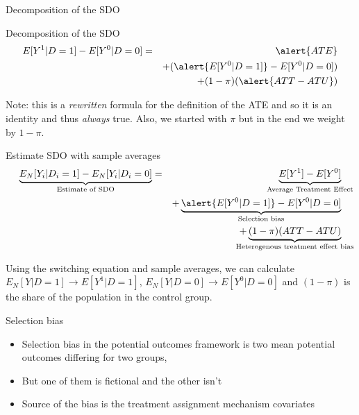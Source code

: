 \documentclass{beamer}
\begin{document}
\begin{frame}{Decomposition of the SDO}

  \begin{block}{Decomposition of the SDO}
    \begin{eqnarray*}
      E[Y^1 | D=1] - E[Y^0 | D=0]  &=& \alert{ATE} \\
      &&+ (\alert{E[Y^0|D=1]} - E[Y^0|D=0])  \\
      && + (1-\pi)(\alert{ATT - ATU})
    \end{eqnarray*}
  \end{block}
  
  \bigskip
  
  Note: this is a \emph{rewritten} formula for the definition of the ATE and so it is an identity and thus \emph{always} true.  Also, we started with $\pi$ but in the end we weight by $1-\pi$.
\end{frame}


\begin{frame}[plain]

  \begin{block}{Estimate SDO with sample averages}
    \begin{eqnarray*}
      \underbrace{E_N[Y_i | D_i=1] - E_N[Y_i | D_i=0]}_{ \mathclap{\text{Estimate of SDO}}}&=& \underbrace{E[Y^1] - E[Y^0]}_{ \mathclap{\text{Average Treatment Effect}}} \\
      &&+ \underbrace{\alert{E[Y^0|D=1]} - E[Y^0 | D=0]}_{ \mathclap{\text{Selection bias}}}  \\
      && + \underbrace{(1-\pi)(ATT - ATU)}_{ \mathclap{\text{Heterogenous treatment effect bias}}}
    \end{eqnarray*}
  \end{block}

\bigskip

Using the switching equation and sample averages, we can calculate $E_N[Y|D=1] \to E[Y^1 | D=1]$, $E_N[Y|D=0] \to E[Y^0|D=0]$ and $(1-\pi)$ is the share of the population in the control group.

\end{frame}


\begin{frame}{Selection bias}

\begin{itemize}
\item Selection bias in the potential outcomes framework is  two mean potential outcomes differing for two groups,
\item But one of them is fictional and the other isn't
\item Source of the bias is the treatment assignment mechanism
covariates

\end{itemize}

\end{frame}
\end{document}
